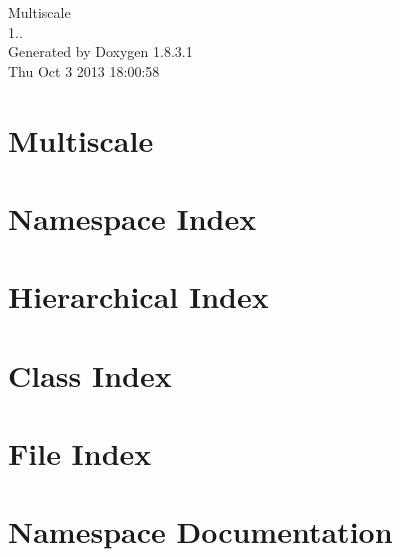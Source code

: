 \documentclass{book}
\begin{document}
\hypersetup{pageanchor=false,citecolor=blue}
\begin{titlepage}
\vspace*{7cm}
\begin{center}
{\Large Multiscale \\[1ex]\large 1.. }\\
\vspace*{1cm}
{\large Generated by Doxygen 1.8.3.1}\\
\vspace*{0.5cm}
{\small Thu Oct 3 2013 18:00:58}\\
\end{center}
\end{titlepage}
\clearemptydoublepage
{}
\tableofcontents
\clearemptydoublepage
{}
\hypersetup{pageanchor=true,citecolor=blue}
\chapter{Multiscale}
\label{index}\hypertarget{index}{}
\chapter{Namespace Index}

\chapter{Hierarchical Index}

\chapter{Class Index}

\chapter{File Index}

\chapter{Namespace Documentation}



\end{document}
